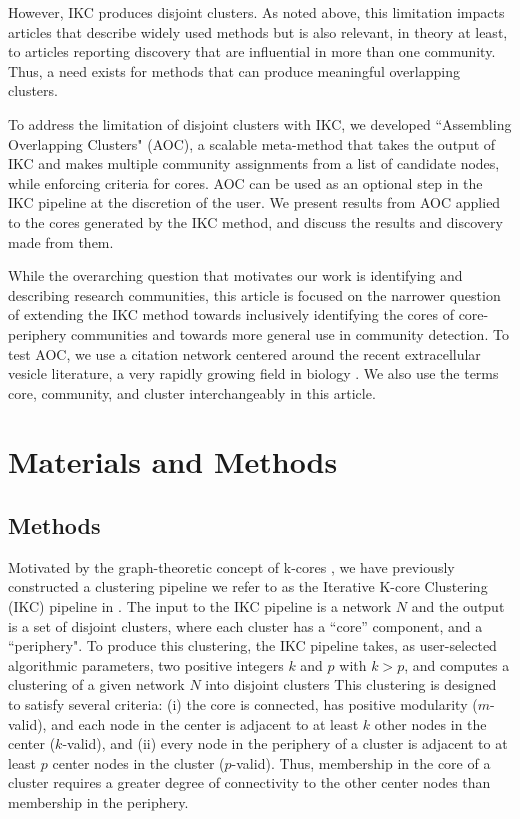 \documentclass[12pt, oneside]{article}   	%
\begin{document}
However, IKC produces disjoint clusters. As noted above, this limitation impacts articles that describe widely used methods but is also relevant, in theory at least, to articles reporting discovery that are influential in more than one community.  Thus, a need exists for methods that can produce meaningful overlapping clusters. 
	

	
To address the limitation of disjoint clusters with IKC, we developed  ``Assembling Overlapping Clusters" (AOC), a scalable meta-method that takes the output of IKC and makes multiple community assignments from a list of candidate nodes, while enforcing criteria for cores. AOC can be used as an optional step in the IKC pipeline at the discretion of the user. We present results from AOC applied to the cores generated by the IKC method, and discuss the results and discovery made from them. 
	
While the overarching question that motivates our work is identifying and describing research communities, this article is focused on the narrower question of extending the IKC method towards inclusively identifying the cores of core-periphery communities and towards more general use in community detection. To test AOC, we use a citation network centered around the recent extracellular vesicle literature, a very rapidly growing field in biology \citep{van2022challenges}. We also use the terms core, community, and cluster interchangeably in this article.

\section{Materials and Methods}
	
\subsection{Methods} Motivated by the graph-theoretic concept of k-cores \citep{Giatsidis2011,malliaros2019}, we have previously constructed a clustering pipeline we refer to as  the Iterative K-core Clustering (IKC) pipeline in \cite{Wedell2022}. The input to the IKC pipeline is a network $N$ and the output is a set of disjoint clusters, where each cluster has a ``core'' component, and a ``periphery".  To produce this clustering,
the IKC pipeline takes, as user-selected algorithmic parameters, two positive integers $k$ and $p$ with $k > p$, and computes a clustering of a given network $N$ into disjoint clusters 
This clustering is designed to satisfy several criteria: (i) the core is connected,  has positive modularity ($m$-valid), and each node in the center  is adjacent to at least $k$ other nodes in the center ($k$-valid), and (ii) every node in the periphery of a cluster is adjacent to at least $p$ center nodes in the cluster ($p$-valid). Thus, membership in the core of a cluster requires a greater degree of connectivity to the other center nodes than membership in the periphery. 
\end{document}
